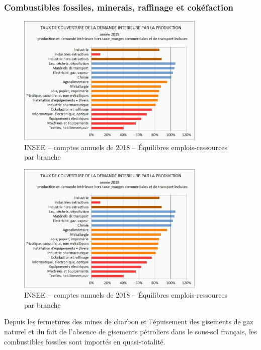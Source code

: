 \documentclass[a4paper]{article}
\begin{document}
\subsubsection{Combustibles fossiles, minerais, raffinage et cokéfaction}

\begin{figure}[H]
    \centering
    \includegraphics*[width=0.8\textwidth]{images/couverture}
    \caption{INSEE – comptes annuels de 2018 – Équilibres emplois-ressources par branche}
    \label{fig:couverture}
\end{figure}

\begin{figure}[H]
    \centering
    \includegraphics*[width=0.8\textwidth]{images/couverture}
    \caption{INSEE – comptes annuels de 2018 – Équilibres emplois-ressources par branche}
    \label{fig:couverture}
\end{figure}

Depuis les fermetures des mines de charbon et l’épuisement des gisements de gaz naturel et du fait de l’absence de gisements pétroliers dans le sous-sol français, les combustibles fossiles sont importés en quasi-totalité. 
\end{document}
